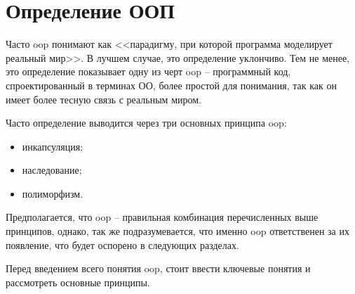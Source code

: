 \section{Определение ООП}\label{sec:history}

Часто \gls{oop} понимают как <<парадигму, при которой программа моделирует реальный мир>>. В лучшем случае, это определение уклончиво. Тем не менее, это определение показывает одну из черт \gls{oop} -- программный код, спроектированный в терминах ОО, более простой для понимания, так как он имеет более тесную связь с реальным миром.

Часто определение выводится через три основных принципа \gls{oop}:
\begin{itemize}
	\item инкапсуляция;
	\item наследование;
	\item полиморфизм.
\end{itemize}

Предполагается, что \gls{oop} -- правильная комбинация перечисленных выше принципов, однако, так же подразумевается, что именно \gls{oop} ответственен за их появление, что будет оспорено в следующих разделах.

Перед введением всего понятия \gls{oop}, стоит ввести ключевые понятия и рассмотреть основные принципы.